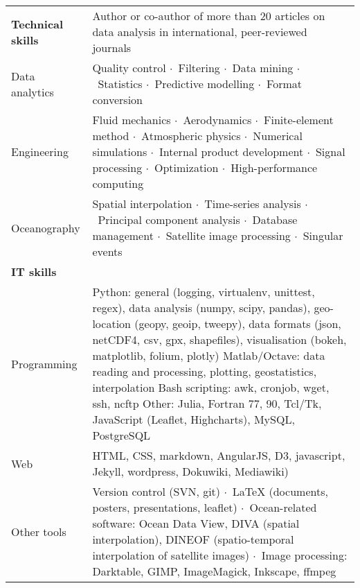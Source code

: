 \documentclass[10pt,a4paper,svgnames]{article}
\newcommand{\sepa}{$\cdot$~}
\begin{document}
\begin{tabular}{p{}| p{}}

\textbf{Technical skills} & Author or co-author of more than 20 articles on data analysis in international, peer-reviewed journals\\
Data analytics & Quality control \sepa Filtering \sepa Data mining \sepa Statistics \sepa Predictive modelling \sepa Format conversion\\

Engineering & Fluid mechanics \sepa Aerodynamics \sepa Finite-element method \sepa Atmospheric physics \sepa Numerical simulations \sepa Internal product development \sepa Signal processing \sepa Optimization \sepa High-performance computing \\

Oceanography & Spatial interpolation \sepa Time-series analysis \sepa Principal component analysis \sepa Database management \sepa Satellite image processing \sepa Singular events \\

\textbf{IT skills} & \\

Programming & Python: general (logging, virtualenv, unittest, regex), data analysis (numpy, scipy, pandas), geo-location (geopy, geoip, tweepy), data formats (json, netCDF4, csv, gpx, shapefiles), visualisation (bokeh, matplotlib, folium, plotly) 
\newline Matlab/Octave: data reading and processing, plotting, geostatistics, interpolation
\newline Bash scripting: awk, cronjob, wget, ssh, ncftp 
\newline Other: Julia, Fortran 77, 90, Tcl/Tk, JavaScript (Leaflet, Highcharts), MySQL, PostgreSQL\\
Web & HTML, CSS, markdown, AngularJS, D3, javascript, Jekyll, wordpress, Dokuwiki, Mediawiki)\\	
Other tools & Version control (SVN, git) \sepa LaTeX (documents, posters, presentations, leaflet) \sepa  Ocean-related software: Ocean Data View, DIVA (spatial interpolation), DINEOF (spatio-temporal interpolation of satellite images) \sepa Image processing: Darktable, GIMP, ImageMagick, Inkscape, ffmpeg\\


\end{tabular}
\end{document}
